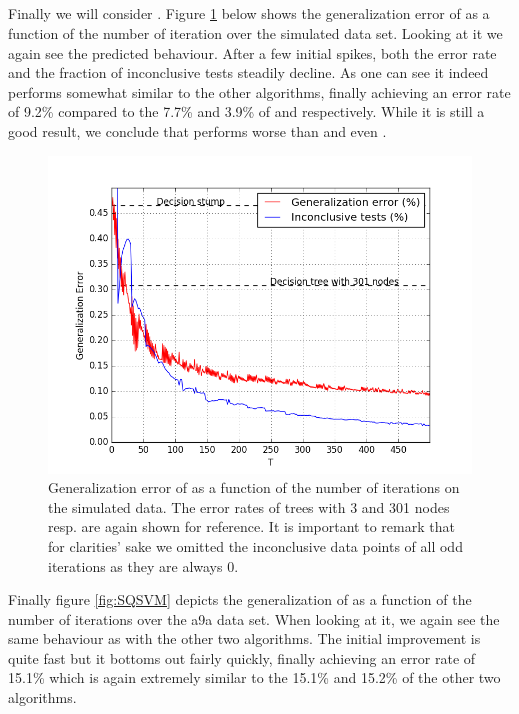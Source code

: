 \subsection{\squintB}
\label{subsec:sqPracPerf}
Finally we will consider \squintB. Figure \ref{fig:SQGD} below shows the generalization error of \squintB as a function of the number of iteration over the simulated data set. Looking at it we again see the predicted behaviour. After a few initial spikes, both the error rate and the fraction of inconclusive tests steadily decline. As one can see it indeed performs somewhat similar to the other algorithms, finally achieving an error rate of 9.2\% compared to the 7.7\% and 3.9\% of \adaB and \NHB respectively. While it is still a good result, we conclude that \squintB performs worse than  \NHB and even \adaB. 
\begin{figure}[!ht]
  \centering
     \includegraphics[width=\graphWidth]{generated/SQGD.png}
  \caption{Generalization error of \squintB as a function of the number of iterations on the simulated data. The error rates of trees with 3 and 301 nodes resp. are again shown for reference. It is important to remark that for clarities' sake we omitted the inconclusive data points of all odd iterations as they are always 0.}
      \label{fig:SQGD}
\end{figure}

\par Finally figure \ref{fig:SQSVM} depicts the generalization of \squintB as a function of the number of iterations over the a9a data set. When looking at it, we again see the same behaviour as with the other two algorithms. The initial improvement is quite fast but it bottoms out fairly quickly, finally achieving an error rate of 15.1\% which is again extremely similar to the 15.1\% and 15.2\% of the other two algorithms. 



